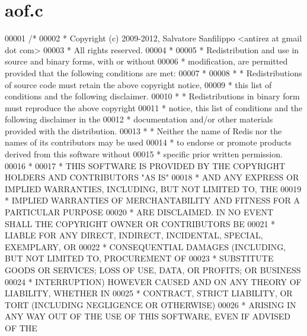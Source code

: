 \hypertarget{aof_8c_source}{}\section{aof.\+c}
\label{aof_8c_source}

\begin{DoxyCode}
00001 \textcolor{comment}{/*}
00002 \textcolor{comment}{ * Copyright (c) 2009-2012, Salvatore Sanfilippo <antirez at gmail dot com>}
00003 \textcolor{comment}{ * All rights reserved.}
00004 \textcolor{comment}{ *}
00005 \textcolor{comment}{ * Redistribution and use in source and binary forms, with or without}
00006 \textcolor{comment}{ * modification, are permitted provided that the following conditions are met:}
00007 \textcolor{comment}{ *}
00008 \textcolor{comment}{ *   * Redistributions of source code must retain the above copyright notice,}
00009 \textcolor{comment}{ *     this list of conditions and the following disclaimer.}
00010 \textcolor{comment}{ *   * Redistributions in binary form must reproduce the above copyright}
00011 \textcolor{comment}{ *     notice, this list of conditions and the following disclaimer in the}
00012 \textcolor{comment}{ *     documentation and/or other materials provided with the distribution.}
00013 \textcolor{comment}{ *   * Neither the name of Redis nor the names of its contributors may be used}
00014 \textcolor{comment}{ *     to endorse or promote products derived from this software without}
00015 \textcolor{comment}{ *     specific prior written permission.}
00016 \textcolor{comment}{ *}
00017 \textcolor{comment}{ * THIS SOFTWARE IS PROVIDED BY THE COPYRIGHT HOLDERS AND CONTRIBUTORS "AS IS"}
00018 \textcolor{comment}{ * AND ANY EXPRESS OR IMPLIED WARRANTIES, INCLUDING, BUT NOT LIMITED TO, THE}
00019 \textcolor{comment}{ * IMPLIED WARRANTIES OF MERCHANTABILITY AND FITNESS FOR A PARTICULAR PURPOSE}
00020 \textcolor{comment}{ * ARE DISCLAIMED. IN NO EVENT SHALL THE COPYRIGHT OWNER OR CONTRIBUTORS BE}
00021 \textcolor{comment}{ * LIABLE FOR ANY DIRECT, INDIRECT, INCIDENTAL, SPECIAL, EXEMPLARY, OR}
00022 \textcolor{comment}{ * CONSEQUENTIAL DAMAGES (INCLUDING, BUT NOT LIMITED TO, PROCUREMENT OF}
00023 \textcolor{comment}{ * SUBSTITUTE GOODS OR SERVICES; LOSS OF USE, DATA, OR PROFITS; OR BUSINESS}
00024 \textcolor{comment}{ * INTERRUPTION) HOWEVER CAUSED AND ON ANY THEORY OF LIABILITY, WHETHER IN}
00025 \textcolor{comment}{ * CONTRACT, STRICT LIABILITY, OR TORT (INCLUDING NEGLIGENCE OR OTHERWISE)}
00026 \textcolor{comment}{ * ARISING IN ANY WAY OUT OF THE USE OF THIS SOFTWARE, EVEN IF ADVISED OF THE}

\end{DoxyCode}
